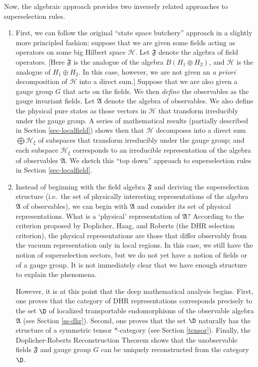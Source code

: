 \documentclass[11pt]{article}
\theoremstyle{definition}
\theoremstyle{definition}
\theoremstyle{remark}
\def\2#1{{\mathcal #1}}
\def\al#1{{\mathfrak #1}}
\begin{document}
Now, the algebraic approach provides two inversely related approaches
to superselection rules.  

\begin{enumerate} \item First, we can follow the original ``state
  space butchery'' approach in a slightly more principled fashion:
  suppose that we are given some fields acting as operators on some
  big Hilbert space $\2H$.  Let $\al F$ denote the algebra of field
  operators.  [Here $\al F$ is the analogue of the algebra $B(H
  _1\oplus H_2)$, and $\2H$ is the analogue of $H_1\oplus H_2$.  In
  this case, however, we are not given an \emph{a priori}
  decomposition of $\2H$ into a direct sum.]  Suppose that we are also
  given a gauge group $G$ that acts on the fields.  We then
  \emph{define} the observables as the gauge invariant fields.  Let
  $\al A$ denote the algebra of observables.  We also define the
  physical pure states as those vectors in $\2H$ that transform
  irreducibly under the gauge group.  A series of mathematical results
  (partially described in Section \ref{sec-localfield}) shows then
  that $\2H$ decomposes into a direct sum $\bigoplus \2H _{\xi}$ of
  subspaces that transform irreducibly under the gauge group; and each
  subspace $\2H _\xi$ corresponds to an irreducible representation of
  the algebra of observables $\al A$.  We sketch this ``top down''
  approach to superselection rules in Section \ref{sec-localfield}.

\item Instead of beginning with the field algebra $\al F$ and deriving
  the superselection structure (i.e.\ the set of physically
  interesting representations of the algebra $\al A$ of observables),
  we can begin with $\al A$ and consider its set of physical
  representations.  What is a `physical' representation of $\al A$?
  According to the criterion proposed by Doplicher, Haag, and Roberts
  (the DHR selection criterion), the physical representations are
  those that differ observably from the vacuum representation only in
  local regions.  In this case, we still have the notion of
  superselection sectors, but we do not yet have a notion of fields or
  of a gauge group.  It is not immediately clear that we have enough
  structure to explain the phenomena.

  However, it is at this point that the deep mathematical analysis
  begins.  First, one proves that the category of DHR representations
  corresponds precisely to the set $\D$ of localized transportable
  endomorphisms of the observable algebra $\al A$ (see Section
  \ref{ss-dhr}).  Second, one proves that the set $\D$ naturally has
  the structure of a symmetric tensor $*$-category (see Section
  \ref{tensor}).  Finally, the Doplicher-Roberts Reconstruction
  Theorem shows that the unobservable fields $\al F$ and gauge group
  $G$ can be uniquely reconstructed from the category
  $\D$. \end{enumerate}
\end{document}
